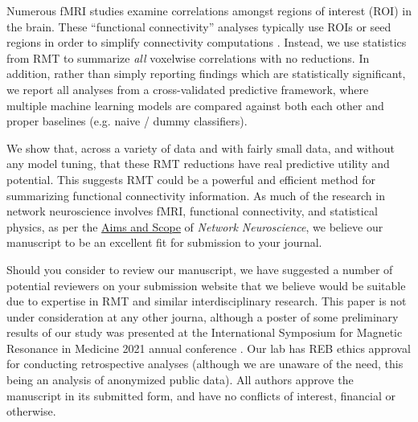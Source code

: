 \documentclass[10pt]{article}
\begin{document}
Numerous fMRI studies examine correlations amongst regions of interest (ROI) in the brain. These
``functional connectivity'' analyses typically use ROIs or seed regions in order to simplify
connectivity computations \citep{huettelFunctionalMagneticResonance2004}. Instead, we use
statistics from RMT to summarize \emph{all} voxelwise correlations with no reductions. In
addition, rather than simply reporting findings which are statistically significant, we report all
analyses from a cross-validated predictive framework, where multiple machine learning models are
compared against both each other and proper baselines (e.g. naive / dummy classifiers).

We show that, across a variety of data and with fairly small data, and without any model tuning,
that these RMT reductions have real predictive utility and potential. This suggests RMT could
be a powerful and efficient method for summarizing functional connectivity information. As much of the
research in network neuroscience involves fMRI, functional connectivity, and statistical physics, as
per the \href{https://direct.mit.edu/netn/pages/submission-guidelines#aims}{Aims and Scope} of \emph{Network
Neuroscience}, we believe our manuscript to be an excellent fit for submission to your journal.

Should you consider to review our manuscript, we have suggested a number of potential reviewers on
your submission website that we believe would be suitable due to expertise in RMT and similar
interdisciplinary research. This paper is not under consideration at any other journa, although a
poster of some preliminary results of our study was presented at the International Symposium for
Magnetic Resonance in Medicine 2021 annual conference \citep{bergerOpenSourceRandom2021}. Our lab
has REB ethics approval for conducting retrospective analyses (although we are unaware of the need,
this being an analysis of anonymized public data). All authors approve the manuscript in its
submitted form, and have no conflicts of interest, financial or otherwise.
\end{document}
